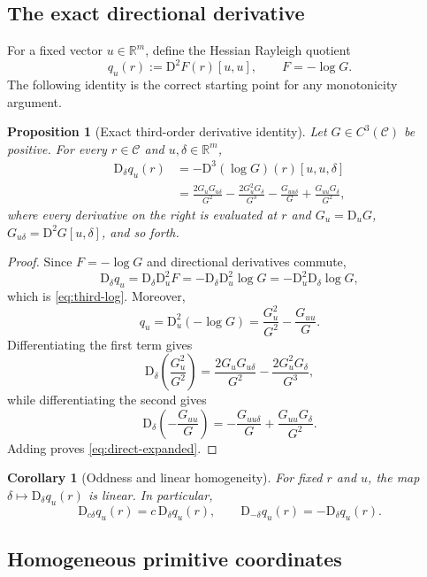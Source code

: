 \documentclass[11pt]{article}
\newtheorem{proposition}[theorem]{Proposition}
\newtheorem{corollary}[theorem]{Corollary}
\theoremstyle{definition}
\newcommand{\R}{\mathbb{R}}
\newcommand{\C}{\mathcal{C}}
\newcommand{\D}{\mathrm{D}}
\begin{document}
\subsection{The exact directional derivative}

For a fixed vector $u\in\R^m$, define the Hessian Rayleigh quotient
\[
 q_u(r):=\D^2F(r)[u,u],\qquad F=-\log G.
\]
The following identity is the correct starting point for any monotonicity argument.

\begin{proposition}[Exact third-order derivative identity]\label{prop:direct-derivative}
Let $G\in C^3(\C)$ be positive.  For every $r\in\C$ and $u,\delta\in\R^m$,
\begin{align}
 \D_\delta q_u(r)
 &= -\D^3(\log G)(r)[u,u,\delta] \label{eq:third-log}\\
 &= \frac{2G_uG_{u\delta}}{G^2}
    -\frac{2G_u^2G_\delta}{G^3}
    -\frac{G_{uu\delta}}{G}
    +\frac{G_{uu}G_\delta}{G^2},               \label{eq:direct-expanded}
\end{align}
where every derivative on the right is evaluated at $r$ and
$G_u=\D_uG$, $G_{u\delta}=\D^2G[u,\delta]$, and so forth.
\end{proposition}

\begin{proof}
Since $F=-\log G$ and directional derivatives commute,
\[
 \D_\delta q_u
 =\D_\delta\D_u^2F
 =-\D_\delta\D_u^2\log G
 =-\D_u^2\D_\delta\log G,
\]
which is \eqref{eq:third-log}.  Moreover,
\[
 q_u=\D_u^2(-\log G)=\frac{G_u^2}{G^2}-\frac{G_{uu}}G.
\]
Differentiating the first term gives
\[
 \D_\delta\!\left(\frac{G_u^2}{G^2}\right)
 =\frac{2G_uG_{u\delta}}{G^2}
  -\frac{2G_u^2G_\delta}{G^3},
\]
while differentiating the second gives
\[
 \D_\delta\!\left(-\frac{G_{uu}}G\right)
 =-\frac{G_{uu\delta}}G+\frac{G_{uu}G_\delta}{G^2}.
\]
Adding proves \eqref{eq:direct-expanded}.
\end{proof}

\begin{corollary}[Oddness and linear homogeneity]\label{cor:oddness}
For fixed $r$ and $u$, the map $\delta\mapsto\D_\delta q_u(r)$ is linear.  In particular,
\[
 \D_{c\delta}q_u(r)=c\,\D_\delta q_u(r),
 \qquad
 \D_{-\delta}q_u(r)=-\D_\delta q_u(r).
\]
\end{corollary}

\subsection{Homogeneous primitive coordinates}
\end{document}

